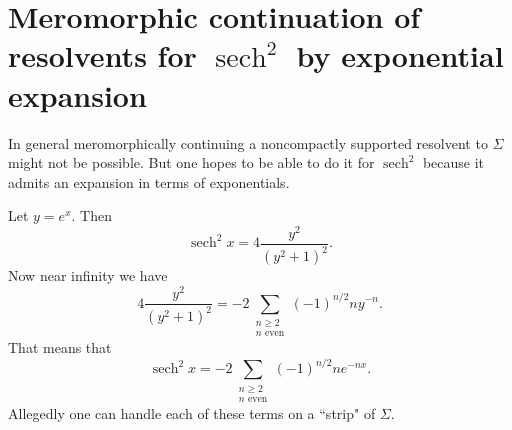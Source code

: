 \documentclass[12pt]{report}
\DeclareMathOperator{\sech}{sech}
\theoremstyle{definition}
\begin{document}
\section{Meromorphic continuation of resolvents for $\sech^2$ by exponential expansion}
In general meromorphically continuing a noncompactly supported resolvent to $\Sigma$ might not be possible. But one hopes to be able to do it for $\sech^2$ because it admits an expansion in terms of exponentials.

Let $y = e^x$. Then
$$\sech^2 x = 4\frac{y^2}{(y^2 + 1)^2}.$$
Now near infinity we have
$$4\frac{y^2}{(y^2 + 1)^2} = -2\sum_{\substack{n \geq 2\\n\text{ even}}}(-1)^{n/2} ny^{-n}.$$
That means that
$$\sech^2 x = -2\sum_{\substack{n \geq 2\\n\text{ even}}}(-1)^{n/2} ne^{-nx}.$$
Allegedly one can handle each of these terms on a ``strip" of $\Sigma$.





\newpage
\printindex
\end{document}
